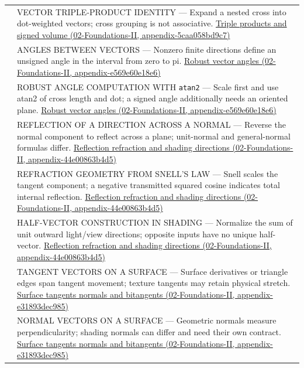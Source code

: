 {\begin{longtable}[]{@{}
  >{\raggedright\arraybackslash}p{}
  >{\raggedright\arraybackslash}p{}@{}}
550 & VECTOR TRIPLE-PRODUCT IDENTITY --- Expand a nested cross into dot-weighted vectors; cross grouping is not associative. \href{../02-Foundations-II/main.pdf\#nameddest=appendix-5caa058bd9c7}{Triple products and signed volume (02-Foundations-II, appendix-5caa058bd9c7)} \\
551 & ANGLES BETWEEN VECTORS --- Nonzero finite directions define an unsigned angle in the interval from zero to pi. \href{../02-Foundations-II/main.pdf\#nameddest=appendix-e569e60e18e6}{Robust vector angles (02-Foundations-II, appendix-e569e60e18e6)} \\
552 & ROBUST ANGLE COMPUTATION WITH \texttt{atan2} --- Scale first and use atan2 of cross length and dot; a signed angle additionally needs an oriented plane. \href{../02-Foundations-II/main.pdf\#nameddest=appendix-e569e60e18e6}{Robust vector angles (02-Foundations-II, appendix-e569e60e18e6)} \\
553 & REFLECTION OF A DIRECTION ACROSS A NORMAL --- Reverse the normal component to reflect across a plane; unit-normal and general-normal formulas differ. \href{../02-Foundations-II/main.pdf\#nameddest=appendix-44e00863b4d5}{Reflection refraction and shading directions (02-Foundations-II, appendix-44e00863b4d5)} \\
554 & REFRACTION GEOMETRY FROM SNELL'S LAW --- Snell scales the tangent component; a negative transmitted squared cosine indicates total internal reflection. \href{../02-Foundations-II/main.pdf\#nameddest=appendix-44e00863b4d5}{Reflection refraction and shading directions (02-Foundations-II, appendix-44e00863b4d5)} \\
555 & HALF-VECTOR CONSTRUCTION IN SHADING --- Normalize the sum of unit outward light/view directions; opposite inputs have no unique half-vector. \href{../02-Foundations-II/main.pdf\#nameddest=appendix-44e00863b4d5}{Reflection refraction and shading directions (02-Foundations-II, appendix-44e00863b4d5)} \\
556 & TANGENT VECTORS ON A SURFACE --- Surface derivatives or triangle edges span tangent movement; texture tangents may retain physical stretch. \href{../02-Foundations-II/main.pdf\#nameddest=appendix-e31893dec985}{Surface tangents normals and bitangents (02-Foundations-II, appendix-e31893dec985)} \\
557 & NORMAL VECTORS ON A SURFACE --- Geometric normals measure perpendicularity; shading normals can differ and need their own contract. \href{../02-Foundations-II/main.pdf\#nameddest=appendix-e31893dec985}{Surface tangents normals and bitangents (02-Foundations-II, appendix-e31893dec985)} \\

\end{longtable}}
